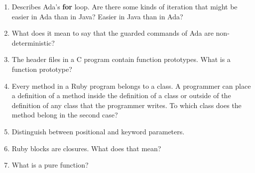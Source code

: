 \begin{enumerate}
  \item Describes Ada's \textbf{for} loop. Are there some
    kinds of iteration that might be easier in Ada than
    in Java? Easier in Java than in Ada?

  \begin{answer}
   
  \end{answer}

  \item What does it mean to say that the guarded commands
    of Ada are non-deterministic?

  \begin{answer}
   
  \end{answer}

  \item The header files in a C program contain function
    prototypes. What is a function prototype?

  \begin{answer}
   
  \end{answer}

  \item Every method in a Ruby program belongs to a class.
    A programmer can place a definition of a method inside
    the definition of a class or outside of the definition
    of any class that the programmer writes. To which class
    does the method belong in the second case?

  \begin{answer}
   
  \end{answer}

  \item Distinguish between positional and keyword parameters.

  \begin{answer}
   
  \end{answer}

  \item Ruby blocks are closures. What does that mean?

  \begin{answer}
   
  \end{answer}

  \item What is a pure function?

  \begin{answer}
   

\end{answer}
\end{enumerate}
